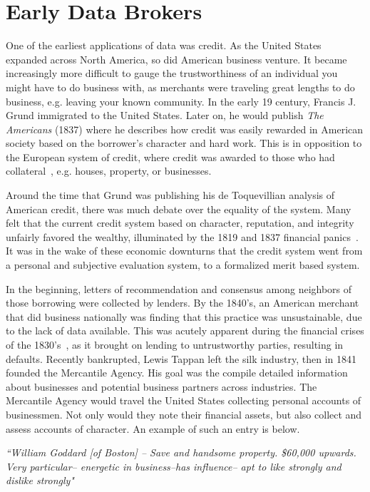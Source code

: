 \section{Early Data Brokers}

One of the earliest applications of data was credit. As the United States
expanded across North America, so did American business venture. It became increasingly more
difficult to gauge the trustworthiness of an individual you might have to do
business with, as merchants were traveling great lengths to do business, e.g. leaving your known community. In the
early 19 century, Francis J. Grund immigrated to the United States.
Later on, he would publish \textit{The Americans} (1837) where he describes how
credit was easily rewarded in American society based on the borrower's
character and hard work. This is in opposition to the European system of
credit, where credit was awarded to those who had
collateral~\cite{lauer2017creditworthy}, e.g. houses, property, or businesses.

Around the time that Grund was publishing his de Toquevillian analysis of
American credit, there was much debate over the equality of the system.
Many felt that the current credit system based on character, reputation, and
integrity unfairly favored the wealthy, illuminated by the 1819 and 1837 financial
panics~\cite{lauer2017creditworthy}. It was in the wake of these economic
downturns that the credit system went from a personal and subjective evaluation
system, to a formalized merit based system.

In the beginning, letters of recommendation and consensus among neighbors of
those borrowing were collected by lenders. By the 1840's, an American
merchant that did business nationally was finding that this practice was
unsustainable, due to the lack of data available. This was acutely apparent during the financial crises of the
1830's~\cite{lauer2017creditworthy}, as it brought on lending to
untrustworthy parties, resulting in defaults. Recently bankrupted, Lewis Tappan left the
silk industry, then in 1841 founded the Mercantile Agency. His goal was the
compile detailed information about businesses and potential business partners across industries.
The Mercantile Agency would travel the United States collecting personal accounts
of businessmen. Not only would they note their financial assets, but also
collect and assess accounts of character. An example of such an entry is below.

\begin{center} \textit{
		``William Goddard [of Boston] -- Save and handsome property. \$60,000 upwards.
		Very particular-- energetic in business--has influence-- apt to like strongly
		and dislike strongly"}
\end{center}

